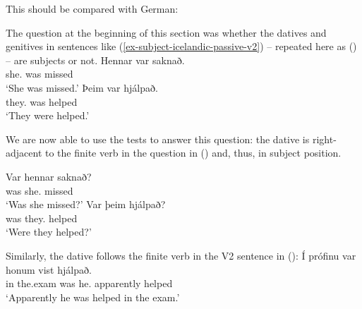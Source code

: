 This should be compared with German:
\eal
{}
\zl


The question at the beginning of this section was whether the datives and genitives in sentences
like (\ref{ex-subject-icelandic-passive-v2}) -- repeated here as () -- are subjects or not.
\eal
\ex 
\gll Hennar     var saknað.\\
     she.\GEN{} was missed\\\icelandic
\glt `She was missed.'
\ex 
\gll Þeim        var hjálpað.\\
     they.\DAT{} was helped\\
\glt `They were helped.'
\zl

We are now able to use the tests to answer this question: the dative is right-adjacent to the finite
verb in the question in () and, thus, in subject position.

\eal
\ex 
\gll Var hennar saknað?\\
     was she.\GEN{} missed\\\icelandic
\glt `Was she missed?'
\ex
\gll Var þeim       hjálpað?\\
     was they.\DAT{} helped   \\
\glt `Were they helped?'
\zl



\noindent
Similarly, the dative follows the finite verb in the V2 sentence in ():
\ea
\gll Í prófinu  var honum vist hjálpað.\\
     in the.exam was he.\DAT{} apparently helped\\\icelandic
\glt `Apparently he was helped in the exam.'
\z


